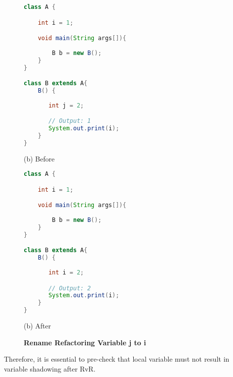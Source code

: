 \begin{figure}[th]
\centering
\begin{minipage}[t]{0.47\linewidth}
\begin{lstlisting}[language=java, basicstyle=\scriptsize\ttfamily,frame=single]
class A {

    int i = 1;

    void main(String args[]){
		
        B b = new B(); 
    }
}

class B extends A{
    B() {
    	
       int j = 2;

       // Output: 1
       System.out.print(i); 
    }
}
\end{lstlisting}
\centering(b) Before 
\end{minipage}
\hfill
\begin{minipage}[t]{0.47\linewidth}
\begin{lstlisting}[language=java, basicstyle=\scriptsize\ttfamily,frame=single]
class A {

    int i = 1;

    void main(String args[]){
		
        B b = new B(); 
    }
}

class B extends A{
    B() {
    	
       int i = 2;

       // Output: 2
       System.out.print(i); 
    }
}
\end{lstlisting}
\centering(b) After 
\end{minipage}
\caption{\textbf{Rename Refactoring Variable j to i}}
\label{figure:precond5_4}
\end{figure}


Therefore, it is essential to pre-check that local variable must not result in variable shadowing after RvR.